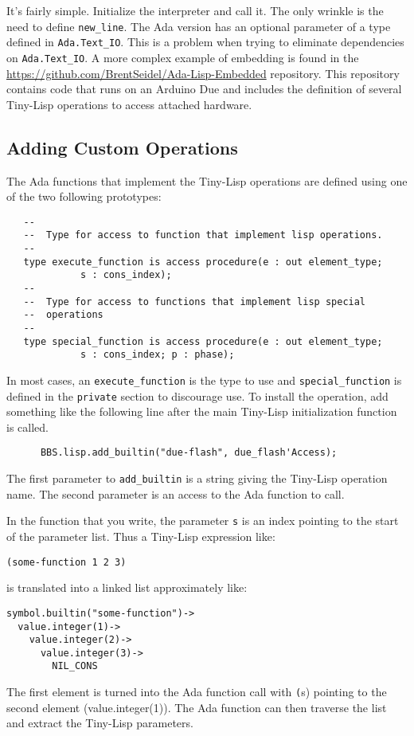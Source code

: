\documentclass[10pt, openany]{book}
\newcommand{\package}[1]{\texttt{#1}}
\newcommand{\function}[1]{\texttt{#1}}
\newcommand{\keyword}[1]{\texttt{#1}}
\newcommand{\datatype}[1]{\texttt{#1}}
\newcommand{\tl}{Tiny-Lisp}
\begin{document}
It's fairly simple.  Initialize the interpreter and call it.  The only wrinkle is the need to define \function{new\_line}.  The Ada version has an optional parameter of a type defined in \package{Ada.Text\_IO}.  This is a problem when trying to eliminate dependencies on \package{Ada.Text\_IO}.  A more complex example of embedding is found in the \url{https://github.com/BrentSeidel/Ada-Lisp-Embedded} repository.  This repository contains code that runs on an Arduino Due and includes the definition of several \tl{} operations to access attached hardware.

\subsection{Adding Custom Operations}
The Ada functions that implement the \tl{} operations are defined using one of the two following prototypes:
\begin{lstlisting}
   --
   --  Type for access to function that implement lisp operations.
   --
   type execute_function is access procedure(e : out element_type;
             s : cons_index);
   --
   --  Type for access to functions that implement lisp special
   --  operations
   --
   type special_function is access procedure(e : out element_type;
             s : cons_index; p : phase);
\end{lstlisting}
In most cases, an \datatype{execute\_function} is the type to use and \datatype{special\_function} is defined in the \keyword{private} section to discourage use.  To install the operation, add something like the following line after the main \tl{} initialization function is called.
\begin{lstlisting}
      BBS.lisp.add_builtin("due-flash", due_flash'Access);
\end{lstlisting}
The first parameter to \keyword{add\_builtin} is a string giving the \tl{} operation name.  The second parameter is an access to the Ada function to call.

In the function that you write, the parameter \keyword{s} is an index pointing to the start of the parameter list.  Thus a \tl{} expression like:
\lstset{language=[Tiny]Lisp}
\begin{lstlisting}
(some-function 1 2 3)
\end{lstlisting}
is translated into a linked list approximately like:
\begin{lstlisting}
symbol.builtin("some-function")->
  value.integer(1)->
    value.integer(2)->
      value.integer(3)->
        NIL_CONS
\end{lstlisting}
The first element is turned into the Ada function call with \keyword(s) pointing to the second element (value.integer(1)).  The Ada function can then traverse the list and extract the \tl{} parameters.
\lstset{language=Ada}
\end{document}
